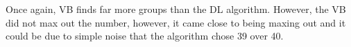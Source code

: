 
Once again, VB finds far more groups than the DL algorithm. However, the VB
did not max out the number, however, it came close to being maxing out and
it could be due to simple noise that the algorithm chose 39 over 40.
